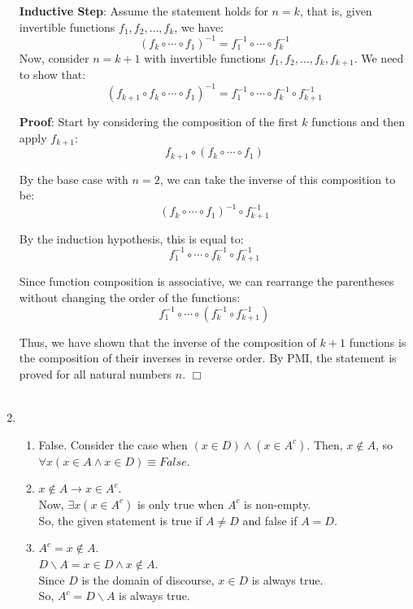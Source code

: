 \documentclass[a4paper]{article}
\def\endproofmark{$\Box$}
\newenvironment{proof}{\par{\bf Proof}:}{\endproofmark\smallskip}
\begin{document}
\begin{enumerate}
    \textbf{Inductive Step}: Assume the statement holds for \( n = k \), that is, given invertible functions \( f_1, f_2, \ldots, f_k \), we have:
    \[(f_k \circ \cdots \circ f_1)^{-1} = f_1^{-1} \circ \cdots \circ f_k^{-1}\]
    Now, consider \( n = k+1 \) with invertible functions \( f_1, f_2, \ldots, f_k, f_{k+1} \). We need to show that:
    \[(f_{k+1} \circ f_k \circ \cdots \circ f_1)^{-1} = f_1^{-1} \circ \cdots \circ f_k^{-1} \circ f_{k+1}^{-1}\]

    \begin{proof}
    Start by considering the composition of the first \( k \) functions and then apply \( f_{k+1} \):
    \[f_{k+1} \circ (f_k \circ \cdots \circ f_1)\]

    By the base case with $n=2$, we can take the inverse of this composition to be:
    \[(f_k \circ \cdots \circ f_1)^{-1} \circ f_{k+1}^{-1}\]

    By the induction hypothesis, this is equal to:
    \[f_1^{-1} \circ \cdots \circ f_k^{-1} \circ f_{k+1}^{-1}\]

    Since function composition is associative, we can rearrange the parentheses without changing the order of the functions:
    \[f_1^{-1} \circ \cdots \circ (f_k^{-1} \circ f_{k+1}^{-1})\]

    Thus, we have shown that the inverse of the composition of \( k+1 \) functions is the composition of their inverses in reverse order. By PMI, the statement is proved for all natural numbers \( n \).
    \end{proof}  \\ \\


    \item \begin{enumerate}
        \item False. Consider the case when $(x \in D) \land (x \in A^c)$. Then, $x \notin A$, so $\forall x (x \in A \land x \in D) \equiv False$.\\
        
        \item $x \notin A \rightarrow x \in A^c$.\\
        Now, $\exists x (x \in A^c)$ is only true when $A^c$ is non-empty.\\
        So, the given statement is true if $A \neq D$ and false if $A = D$.\\

        \item $A^c = x \notin A$.\\
        $D \backslash A = x \in D \land x \notin A$.\\
        Since $D$ is the domain of discourse, $x \in D$ is always true.\\
        So, $A^c = D \backslash A$ is always true.\\


\end{enumerate}
\end{enumerate}
\end{document}
